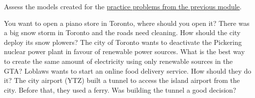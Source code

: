 \begin{exercises}
	Assess the models created for the \hyperref[exercises:models]{practice problems from the previous module}.
	
	\begin{problist}

		\prob You want to open a piano store in Toronto, where should you open it?
		\prob There was a big snow storm in Toronto and the roads need cleaning. How should the city deploy its snow plowers?
		\prob The city of Toronto wants to deactivate the Pickering nuclear power plant in favour of renewable power sources. What is the best way to create the same amount of electricity using only renewable sources in the GTA?
		\prob Loblaws wants to start an online food delivery service. How should they do it?
		\prob The city airport (YTZ) built a tunnel to access the island airport from the city. Before that, they used a ferry. Was building the tunnel a good decision?	
	\end{problist}
\end{exercises}
